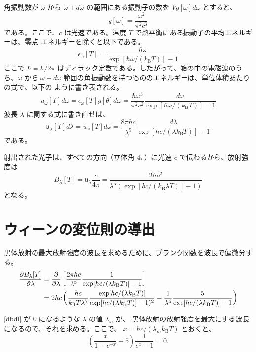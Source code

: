 \documentclass[book]{dennou777}
\begin{document}
角振動数が \(\omega\) から \(\omega+d\omega\) の範囲にある振動子の数を \(Vg[\omega]d\omega\)
とすると、
\begin{equation}
	g[\omega]=\frac{\omega^2}{\pi^2c^3}
\end{equation}
である。ここで、\(c\) は光速である。温度 \(T\) で熱平衡にある振動子の平均エネルギーは、零点
エネルギーを除くと以下である。
\begin{equation}
	\epsilon_\omega[T]=\frac{\hbar\omega}{\exp[\hbar\omega/(k_\mathrm{B}T)]-1}
\end{equation}
ここで \(\hbar=h/2\pi\) はディラック定数である。したがって、箱の中の電磁波のうち、\(\omega\)
から \(\omega+d\omega\) 範囲の角振動数を持つもののエネルギーは、単位体積あたりの式で、以下の
ように書き表される。
\begin{equation}
	u_\omega[T]d\omega=\epsilon_\omega[T]g[\theta]d\omega
	=\frac{\hbar\omega^3}{\pi^2c^2}\frac{d\omega}{\exp[\hbar\omega/(k_\mathrm{B}T)]-1}
\end{equation}
波長 \(\lambda\) に関する式に書き直せば、
\begin{equation}
	\mathfrak{u}_\lambda[T]d\lambda=u_\omega[T]d\omega
	=\frac{8\pi hc}{\lambda^5}\frac{d\lambda}{\exp[hc/(\lambda k_\mathrm{B}T)]-1}
\end{equation}
である。

射出された光子は、すべての方向（立体角 \(4\pi\)）に光速 \(c\) で伝わるから、放射強度は
\begin{equation}
	B_\lambda[T]=\mathfrak{u}_\lambda\frac{c}{4\pi}=
	\frac{2hc^2}{\lambda^5(\exp[hc/(k_\mathrm{B}\lambda T)]-1)}
\end{equation}
となる。

\chapter{ウィーンの変位則の導出}
黒体放射の最大放射強度の波長を求めるために、プランク関数を波長で偏微分する。
\begin{align}
	\frac{\partial B_\lambda[T]}{\partial\lambda}
	&=\frac{\partial}{\partial\lambda}\left[\frac{2\pi hc}{\lambda^5}
		\frac{1}{\exp[hc/(\lambda k_\mathrm{B}T)]-1}\right]\notag\\
	&=2hc\left(\frac{hc}{k_\mathrm{B}T\lambda^7}
		\frac{\exp[hc/(\lambda k_\mathrm{B}T)]}{\exp[hc/(\lambda k_\mathrm{B}T)]-1)^2}
		-\frac{1}{\lambda^6}\frac{5}{\exp[hc/(\lambda k_\mathrm{B}T)]-1}\right)\label{dbdl}
\end{align}

\eqref{dbdl} が \(0\) になるような \(\lambda\) の値 \(\lambda_m\) が、
黒体放射の放射強度を最大にする波長になるので、それを求める。ここで、
\(x=hc/(\lambda_m k_\mathrm{B}T)\) とおくと、
\begin{equation}
	\left(\frac{x}{1-e^{-x}}-5\right)\frac{1}{e^x-1}=0.\label{dbdlx}
\end{equation}
\end{document}

